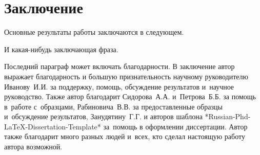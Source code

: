 \chapter*{Заключение}                       %


Основные результаты работы заключаются в следующем.

И какая-нибудь заключающая фраза.

Последний параграф может включать благодарности.  В заключение автор
выражает благодарность и большую признательность научному руководителю
Иванову~И.\:И. за поддержку, помощь, обсуждение результатов и~научное
руководство. Также автор благодарит Сидорова~А.\:А. и~Петрова~Б.\:Б.
за помощь в~работе с~образцами, Рабиновича~В.\:В. за предоставленные
образцы и~обсуждение результатов, Занудятину~Г.\:Г. и авторов шаблона
*Russian-Phd-LaTeX-Dissertation-Template* за~помощь в оформлении
диссертации. Автор также благодарит много разных людей
и~всех, кто сделал настоящую работу автора возможной.
